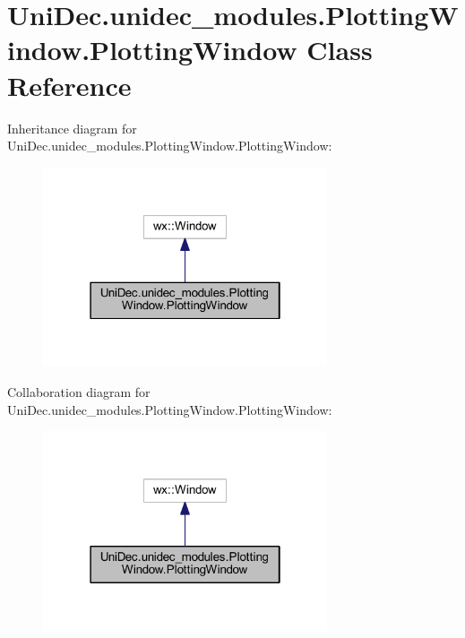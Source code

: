 \hypertarget{class_uni_dec_1_1unidec__modules_1_1_plotting_window_1_1_plotting_window}{}\section{Uni\+Dec.\+unidec\+\_\+modules.\+Plotting\+Window.\+Plotting\+Window Class Reference}
\label{class_uni_dec_1_1unidec__modules_1_1_plotting_window_1_1_plotting_window}


Inheritance diagram for Uni\+Dec.\+unidec\+\_\+modules.\+Plotting\+Window.\+Plotting\+Window\+:\nopagebreak
\begin{figure}[H]
\begin{center}
\leavevmode
\includegraphics[width=238pt]{class_uni_dec_1_1unidec__modules_1_1_plotting_window_1_1_plotting_window__inherit__graph}
\end{center}
\end{figure}


Collaboration diagram for Uni\+Dec.\+unidec\+\_\+modules.\+Plotting\+Window.\+Plotting\+Window\+:\nopagebreak
\begin{figure}[H]
\begin{center}
\leavevmode
\includegraphics[width=238pt]{class_uni_dec_1_1unidec__modules_1_1_plotting_window_1_1_plotting_window__coll__graph}
\end{center}
\end{figure}
